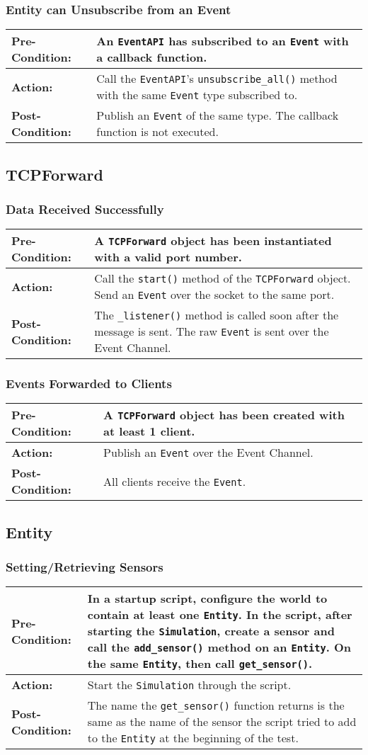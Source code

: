 \documentclass[titlepage]{article}
\newcommand{\testcase}[3]{
    \begin{center}
    \begin{tabular}{| l | p{0.7\textwidth}|}
        \hline
        \rowcolor[gray]{0.8}\textbf{Pre-Condition:} & #1 \\ \hline
        \textbf{Action:} & #2 \\ \hline
        \rowcolor[gray]{0.8}\textbf{Post-Condition:} & #3 \\ \hline
    \end{tabular}
    \end{center}
}
\begin{document}
\subsubsection{Entity can Unsubscribe from an Event}
\testcase{An \texttt{EventAPI} has subscribed to an \texttt{Event} with a callback function.}{Call the \texttt{EventAPI}'s \texttt{unsubscribe\_all()} method with the same \texttt{Event} type subscribed to.}{Publish an \texttt{Event} of the same type. The callback function is not executed.}

\subsection{TCPForward}
\subsubsection{Data Received Successfully}
\testcase{A \texttt{TCPForward} object has been instantiated with a valid port number.}{Call the \texttt{start()} method of the \texttt{TCPForward} object. Send an \texttt{Event} over the socket to the same port. }{The \texttt{\_listener()} method is called soon after the message is sent. The raw \texttt{Event} is sent over the Event Channel. }

\subsubsection{Events Forwarded to Clients}
\testcase{A \texttt{TCPForward} object has been created with at least 1 client.}{Publish an \texttt{Event} over the Event Channel.}{All clients receive the \texttt{Event}.}

\subsection{Entity}
\subsubsection{Setting/Retrieving Sensors}
\testcase{In a startup script, configure the world to contain at least one \texttt{Entity}. In the script, after starting the \texttt{Simulation}, create a sensor and call the \texttt{add\_sensor()} method on an \texttt{Entity}.  On the same \texttt{Entity}, then call \texttt{get\_sensor()}.}{Start the \texttt{Simulation} through the script.}{The name the \texttt{get\_sensor()} function returns is the same as the name of the sensor the script tried to add to the \texttt{Entity} at the beginning of the test.}
\end{document}
